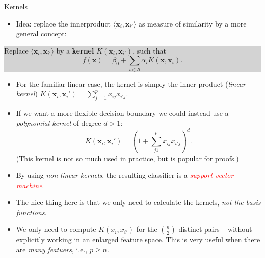 \documentclass[10pt,ignorenonframetext,]{beamer}
\providecommand{\tightlist}{%
  \setlength{\itemsep}{0pt}\setlength{\parskip}{0pt}}
\begin{document}
\begin{frame}

\begin{block}{Kernels}

\begin{itemize}
\tightlist
\item
  Idea: replace the innerproduct
  \(\langle {\boldsymbol x}_i, {\boldsymbol x}_{i'}\rangle\) as measure
  of similarity by a more general concept:
\end{itemize}

\begin{center}
\colorbox{lightgray}{\begin{minipage}{10cm}
Replace $\langle {\boldsymbol x}_i, {\boldsymbol x}_{i'}\rangle$ by a {\bf kernel} 
$K({\boldsymbol x}_i,{\boldsymbol x}_{i'})$, such that
$$
f({\boldsymbol x})=\beta_0 + \sum_{i \in \mathcal{S}} \alpha_i K({\boldsymbol x},{\boldsymbol x}_i).
$$
\end{minipage}}
\end{center}

\begin{itemize}
\tightlist
\item
  For the familiar linear case, the kernel is simply the inner product
  (\emph{linear kernel})
  \(K({\boldsymbol x}_i,{\boldsymbol x}_i')=\sum_{j=1}^p x_{ij}x_{i'j}\).
\end{itemize}

\begin{itemize}
\tightlist
\item
  If we want a more flexible decision boundary we could instead use a
  \emph{polynomial kernel} of degree \(d>1\): \[
  K({\boldsymbol x}_i,{\boldsymbol x}_i')=(1+\sum_{j1}^p x_{ij} x_{i'j})^d.
  \] (This kernel is not so much used in practice, but is popular for
  proofs.)
\end{itemize}

\end{block}

\end{frame}

\begin{frame}

\begin{itemize}
\item
  By using \emph{non-linear kernels}, the resulting classifier is a
  \emph{\textcolor{red}{support vector machine}}.
\item
  The nice thing here is that we only need to calculate the kernels,
  \emph{not the basis functions}.
\item
  We only need to compute \(K(x_i,x_{i'})\) for the \({n \choose 2}\)
  distinct pairs -- without explicitly working in an enlarged feature
  space. This is very useful when there are \emph{many featuers}, i.e.,
  \(p\geq n\).
\end{itemize}

\end{frame}
\end{document}
